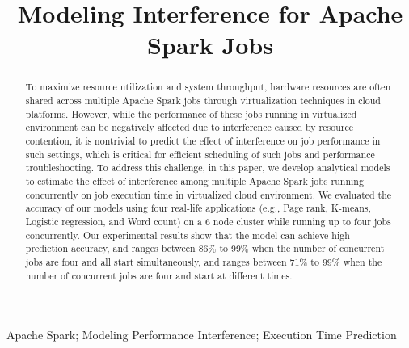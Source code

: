 \documentclass[conference]{IEEEtran}
\begin{document}
\title{Modeling Interference for Apache Spark Jobs}



\author{
}


\maketitle


\begin{abstract}

To maximize resource utilization and system throughput, hardware resources are often shared across multiple Apache Spark jobs through virtualization techniques in cloud platforms. However, while the performance of these jobs running in virtualized environment can be negatively affected due to interference caused by resource contention, it is nontrivial to predict the effect of interference on job performance in such settings, which is critical for efficient scheduling of such jobs and performance troubleshooting. To address this challenge, in this paper, we develop analytical models to estimate the effect of interference among multiple Apache Spark jobs running concurrently on job execution time in virtualized cloud environment. We evaluated the accuracy of our models using four real-life applications (e.g., Page rank, K-means, Logistic regression, and Word count) on a 6 node cluster while running up to four jobs concurrently. Our experimental results show that the model can achieve high prediction accuracy, and ranges between 86\% to 99\% when the number of concurrent jobs are four and all start simultaneously, and ranges between 71\% to 99\% when the number of concurrent jobs are four and start at different times.


 



\end{abstract}

\begin{IEEEkeywords}

Apache Spark; Modeling Performance Interference; Execution Time Prediction

\end{IEEEkeywords}
\end{document}
